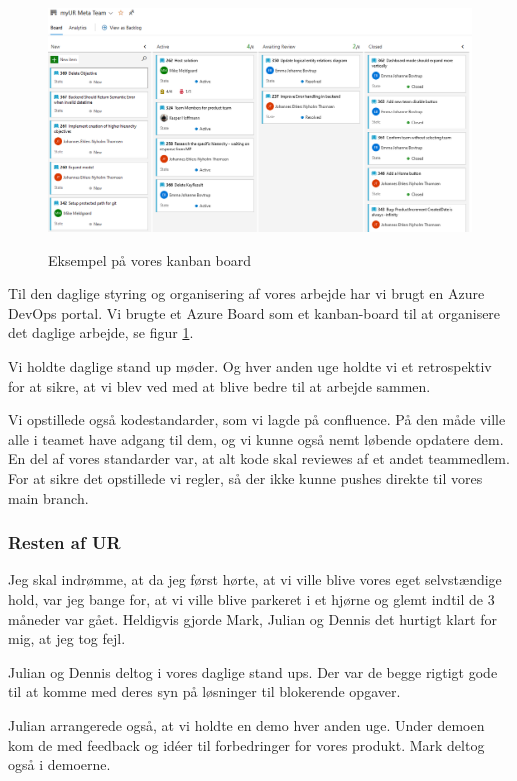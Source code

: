 \documentclass[a4paper]{article}
\begin{document}
\begin{figure}[ht!]
    \includegraphics[width=\linewidth]{kanbanboard.png}
    \centering
    \label{kanban}
    \caption{Eksempel på vores kanban board}
\end{figure}

Til den daglige styring og organisering af vores arbejde
har vi brugt en Azure DevOps portal.
Vi brugte et Azure Board som et kanban-board
til at organisere det daglige arbejde, se figur \ref{kanban}.

Vi holdte daglige stand up møder.
Og hver anden uge holdte vi et retrospektiv for at sikre,
at vi blev ved med at blive bedre til at arbejde sammen.

Vi opstillede også kodestandarder, som vi lagde på confluence.
På den måde ville alle i teamet have adgang til dem,
og vi kunne også nemt løbende opdatere dem.
En del af vores standarder var,
at alt kode skal reviewes af et andet teammedlem.
For at sikre det opstillede vi regler,
så der ikke kunne pushes direkte til vores main branch.

\subsubsection{Resten af UR}
Jeg skal indrømme, at da jeg først hørte,
at vi ville blive vores eget selvstændige hold,
var jeg bange for,
at vi ville blive parkeret i et hjørne og glemt indtil de 3 måneder var gået.
Heldigvis gjorde Mark, Julian og Dennis det hurtigt klart for mig,
at jeg tog fejl.

Julian og Dennis deltog i vores daglige stand ups.
Der var de begge rigtigt gode til at komme med deres syn på løsninger til blokerende opgaver.

Julian arrangerede også, at vi holdte en demo hver anden uge.
Under demoen kom de med feedback og idéer til forbedringer for vores produkt.
Mark deltog også i demoerne.
\end{document}
